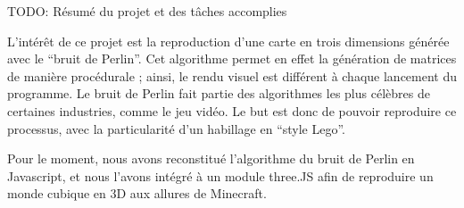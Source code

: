 ﻿TODO: Résumé du projet et des tâches accomplies

L'intérêt de ce projet est la reproduction d'une carte en trois dimensions générée avec le "`bruit de Perlin"'. 
Cet algorithme permet en effet la génération de matrices de manière procédurale ; ainsi, le rendu visuel est différent à chaque lancement du programme. Le bruit de Perlin fait partie des algorithmes les plus célèbres de certaines industries, comme le jeu vidéo. Le but est donc de pouvoir reproduire ce processus, avec la particularité d'un habillage en "`style Lego"'.

Pour le moment, nous avons reconstitué l'algorithme du bruit de Perlin en Javascript, et nous l'avons intégré à un module three.JS afin de reproduire un monde cubique en 3D aux allures de Minecraft.